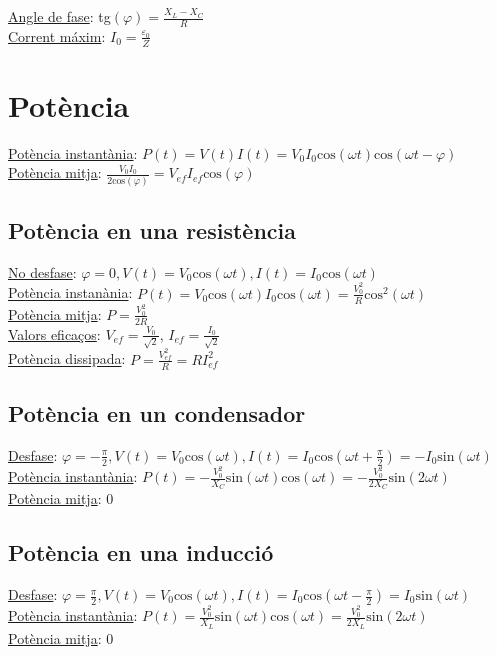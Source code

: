 \documentclass[12pt]{article}
\begin{document}
\begin{multicols}{5}
\underline{Angle de fase}: tg$(\varphi)=\frac{X_L-X_C}{R}$ \\
\underline{Corrent máxim}: $I_0 = \frac{\varepsilon_0}{Z}$

\section{Potència}

\underline{Potència instantània}: $P(t) = V(t)I(t) = V_0I_0\text{cos}(\omega t)\text{cos}(\omega t - \varphi)$ \\
\underline{Potència mitja}: $\frac{V_0I_0}{2\text{cos}(\varphi)} = V_{ef}I_{ef}\text{cos}(\varphi)$

\subsection{Potència en una resistència}

\underline{No desfase}: $\varphi = 0, V(t) = V_0\text{cos}(\omega t), I(t) = I_0\text{cos}(\omega t)$ \\
\underline{Potència instanània}: $P(t) = V_0\text{cos}(\omega t)I_0\text{cos}(\omega t) = \frac{V_0^2}{R}\text{cos}^2(\omega t)$ \\
\underline{Potència mitja}: $P = \frac{V_0^2}{2R}$ \\
\underline{Valors eficaços}: $V_{ef} = \frac{V_0}{\sqrt{2}}$, $I_{ef} = \frac{I_0}{\sqrt{2}}$ \\
\underline{Potència dissipada}: $P = \frac{V_{ef}^2}{R} = RI_{ef}^2$

\subsection{Potència en un condensador}

\underline{Desfase}: $\varphi = -\frac{\pi}{2}, V(t) = V_0\text{cos}(\omega t), I(t) = I_0\text{cos}(\omega t + \frac{\pi}{2}) = -I_0\text{sin}(\omega t)$ \\
\underline{Potència instantània}: $P(t) = -\frac{V_0^2}{X_C}\text{sin}(\omega t)\text{cos}(\omega t) = -\frac{V_0^2}{2X_C}\text{sin}(2\omega t)$ \\
\underline{Potència mitja}: 0

\subsection{Potència en una inducció}

\underline{Desfase}: $\varphi = \frac{\pi}{2}, V(t) = V_0\text{cos}(\omega t), I(t) = I_0\text{cos}(\omega t - \frac{\pi}{2}) = I_0\text{sin}(\omega t)$ \\
\underline{Potència instantània}: $P(t) = \frac{V_0^2}{X_L}\text{sin}(\omega t)\text{cos}(\omega t) = \frac{V_0^2}{2X_L}\text{sin}(2\omega t)$ \\
\underline{Potència mitja}: 0


\end{multicols}
\end{document}
